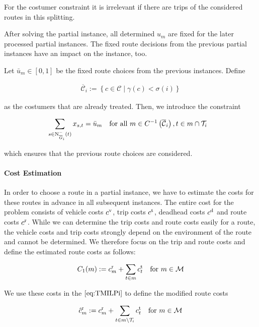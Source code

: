 For the costumer constraint it is irrelevant if there are trips of the considered routes in this splitting.

After solving the partial instance, all determined $u_m$ are fixed for the later processed partial instances. The fixed route decisions from the previous partial instances have an impact on the instance, too. 

Let $\bar{u}_m\in[0,1]$ be the fixed route choices from the previous instances. Define

\begin{align}
	\overline{\mathcal{C}}_i := \left\{c\in\mathcal{C}\mid \gamma\left(c\right)<\sigma(i)\right\}
\end{align}

as the costumers that are already treated. Then, we introduce the constraint

\begin{align}
	&\sum_{s\in\operatorname{N}_{\overline{G}_i}^-(t)} x_{s,t} = \bar{u}_m && \text{for all } m\in C^{-1}\left(\overline{\mathcal{C}}_i\right), t\in m\cap\mathcal{T}_i \label{eq:TMILP:route_fix}
\end{align}

which ensures that the previous route choices are considered.

\paragraph{Cost Estimation} \parfill

In order to choose a route in a partial instance, we have to estimate the costs for these routes in advance in all subsequent instances. The entire cost for the problem consists of vehicle costs $c^{\operatorname{v}}$, trip costs $c^{\operatorname{t}}$, deadhead costs $c^{\operatorname{d}}$ and route costs $c^{\operatorname{r}}$. While we can determine the trip costs and route costs easily for a route, the vehicle costs and trip costs strongly depend on the environment of the route and cannot be determined. We therefore focus on the trip and route costs and define the estimated route costs as follows:

\begin{align*}
	C_1(m) := c^{\operatorname{r}}_m + \sum_{t\in m}c^{\operatorname{t}}_t && \text{for } m\in\mathcal{M}
\end{align*}

We use these costs in the $\eqref{eq:TMILPi}$ to define the modified route costs

\begin{align*}
	\hat{c}^{\operatorname{r}}_m := c^{\operatorname{r}}_m + \sum_{t\in m\backslash\mathcal{T}_i}c^{\operatorname{t}}_t && \text{for } m\in\mathcal{M}
\end{align*}

